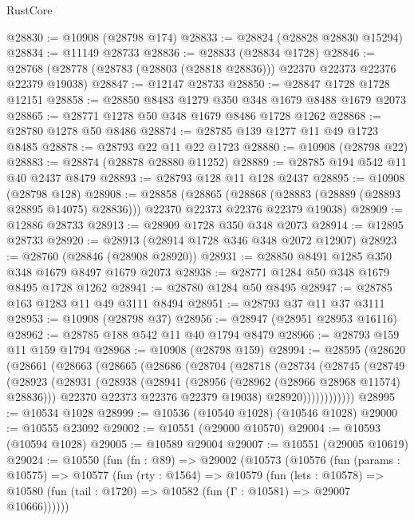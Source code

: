 \begin{lexlean}{RustCore}
\begin{coremodule}
@28830 := @10908 (@28798 @174)
@28833 := @28824 (@28828 @28830 @15294)
@28834 := @11149 @28733
@28836 := @28833 (@28834 @1728)
@28846 := @28768 (@28778 (@28783 (@28803 (@28818 @28836))) @22370 @22373 @22376 @22379 @19038)
@28847 := @12147 @28733
@28850 := @28847 @1728 @1728 @12151
@28858 := @28850 @8483 @1279 @350 @348 @1679 @8488 @1679 @2073
@28865 := @28771 @1278 @50 @348 @1679 @8486 @1728 @1262
@28868 := @28780 @1278 @50 @8486
@28874 := @28785 @139 @1277 @11 @49 @1723 @8485
@28878 := @28793 @22 @11 @22 @1723
@28880 := @10908 (@28798 @22)
@28883 := @28874 (@28878 @28880 @11252)
@28889 := @28785 @194 @542 @11 @40 @2437 @8479
@28893 := @28793 @128 @11 @128 @2437
@28895 := @10908 (@28798 @128)
@28908 := @28858
    (@28865
      (@28868 (@28883 (@28889 (@28893 @28895 @14075) @28836)))
      @22370
      @22373
      @22376
      @22379
      @19038)
@28909 := @12886 @28733
@28913 := @28909 @1728 @350 @348 @2073
@28914 := @12895 @28733
@28920 := @28913 (@28914 @1728 @346 @348 @2072 @12907)
@28923 := @28760 (@28846 (@28908 @28920))
@28931 := @28850 @8491 @1285 @350 @348 @1679 @8497 @1679 @2073
@28938 := @28771 @1284 @50 @348 @1679 @8495 @1728 @1262
@28941 := @28780 @1284 @50 @8495
@28947 := @28785 @163 @1283 @11 @49 @3111 @8494
@28951 := @28793 @37 @11 @37 @3111
@28953 := @10908 (@28798 @37)
@28956 := @28947 (@28951 @28953 @16116)
@28962 := @28785 @188 @542 @11 @40 @1794 @8479
@28966 := @28793 @159 @11 @159 @1794
@28968 := @10908 (@28798 @159)
@28994 := @28595
    (@28620
      (@28661
        (@28663
          (@28665
            (@28686
              (@28704
                (@28718
                  (@28734
                    (@28745
                      (@28749
                        (@28923
                          (@28931
                            (@28938
                              (@28941 (@28956 (@28962 (@28966 @28968 @11574) @28836)))
                              @22370
                              @22373
                              @22376
                              @22379
                              @19038)
                            @28920))))))))))))
@28995 := @10534 @1028
@28999 := @10536 (@10540 @1028) (@10546 @1028)
@29000 := @10555 @23092
@29002 := @10551 (@29000 @10570)
@29004 := @10593 (@10594 @1028)
@29005 := @10589 @29004
@29007 := @10551 (@29005 @10619)
@29024 := @10550
    (fun (fn : @89) =>
    @29002
      (@10573
        (@10576
          (fun (params : @10575) =>
          @10577
            (fun (rty : @1564) =>
            @10579
              (fun (lets : @10578) =>
              @10580 (fun (tail : @1720) => @10582 (fun (Γ : @10581) => @29007 @10666))))))

\end{coremodule}
\end{lexlean}
